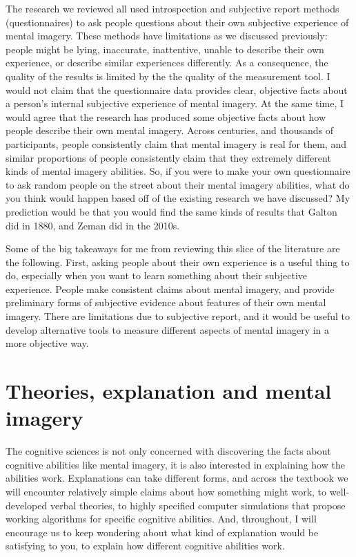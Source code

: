 \documentclass[
  oneside,
  12pt]{crumpbook}
\begin{document}
The research we reviewed all used introspection and subjective report methods (questionnaires) to ask people questions about their own subjective experience of mental imagery. These methods have limitations as we discussed previously: people might be lying, inaccurate, inattentive, unable to describe their own experience, or describe similar experiences differently. As a consequence, the quality of the results is limited by the the quality of the measurement tool. I would not claim that the questionnaire data provides clear, objective facts about a person's internal subjective experience of mental imagery. At the same time, I would agree that the research has produced some objective facts about how people describe their own mental imagery. Across centuries, and thousands of participants, people consistently claim that mental imagery is real for them, and similar proportions of people consistently claim that they extremely different kinds of mental imagery abilities. So, if you were to make your own questionnaire to ask random people on the street about their mental imagery abilities, what do you think would happen based off of the existing research we have discussed? My prediction would be that you would find the same kinds of results that Galton did in 1880, and Zeman did in the 2010s.

Some of the big takeaways for me from reviewing this slice of the literature are the following. First, asking people about their own experience is a useful thing to do, especially when you want to learn something about their subjective experience. People make consistent claims about mental imagery, and provide preliminary forms of subjective evidence about features of their own mental imagery. There are limitations due to subjective report, and it would be useful to develop alternative tools to measure different aspects of mental imagery in a more objective way.

\hypertarget{theories-explanation-and-mental-imagery}{%
\section{Theories, explanation and mental imagery}\label{theories-explanation-and-mental-imagery}}

The cognitive sciences is not only concerned with discovering the facts about cognitive abilities like mental imagery, it is also interested in explaining how the abilities work. Explanations can take different forms, and across the textbook we will encounter relatively simple claims about how something might work, to well-developed verbal theories, to highly specified computer simulations that propose working algorithms for specific cognitive abilities. And, throughout, I will encourage us to keep wondering about what kind of explanation would be satisfying to you, to explain how different cognitive abilities work.
\end{document}
